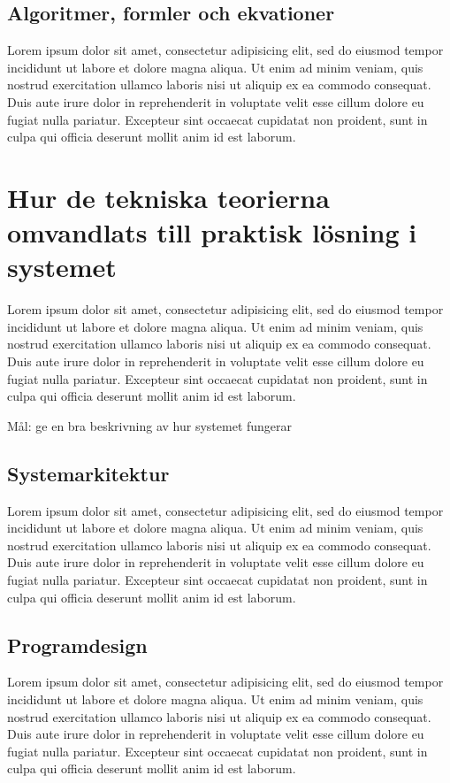 \documentclass[a4paper,12pt,oneside,final]{extbook}
\begin{document}
\subsection{Algoritmer, formler och ekvationer}

Lorem ipsum dolor sit amet, consectetur adipisicing elit, sed do eiusmod tempor incididunt ut labore et dolore magna aliqua. Ut enim ad minim veniam, quis nostrud exercitation ullamco laboris nisi ut aliquip ex ea commodo consequat. Duis aute irure dolor in reprehenderit in voluptate velit esse cillum dolore eu fugiat nulla pariatur. Excepteur sint occaecat cupidatat non proident, sunt in culpa qui officia deserunt mollit anim id est laborum.

\section{Hur de tekniska teorierna omvandlats till praktisk lösning i systemet}

Lorem ipsum dolor sit amet, consectetur adipisicing elit, sed do eiusmod tempor incididunt ut labore et dolore magna aliqua. Ut enim ad minim veniam, quis nostrud exercitation ullamco laboris nisi ut aliquip ex ea commodo consequat. Duis aute irure dolor in reprehenderit in voluptate velit esse cillum dolore eu fugiat nulla pariatur. Excepteur sint occaecat cupidatat non proident, sunt in culpa qui officia deserunt mollit anim id est laborum.

Mål: ge en bra beskrivning av hur systemet fungerar

\subsection{Systemarkitektur}

Lorem ipsum dolor sit amet, consectetur adipisicing elit, sed do eiusmod tempor incididunt ut labore et dolore magna aliqua. Ut enim ad minim veniam, quis nostrud exercitation ullamco laboris nisi ut aliquip ex ea commodo consequat. Duis aute irure dolor in reprehenderit in voluptate velit esse cillum dolore eu fugiat nulla pariatur. Excepteur sint occaecat cupidatat non proident, sunt in culpa qui officia deserunt mollit anim id est laborum.

\subsection{Programdesign}

Lorem ipsum dolor sit amet, consectetur adipisicing elit, sed do eiusmod tempor incididunt ut labore et dolore magna aliqua. Ut enim ad minim veniam, quis nostrud exercitation ullamco laboris nisi ut aliquip ex ea commodo consequat. Duis aute irure dolor in reprehenderit in voluptate velit esse cillum dolore eu fugiat nulla pariatur. Excepteur sint occaecat cupidatat non proident, sunt in culpa qui officia deserunt mollit anim id est laborum.
\end{document}
